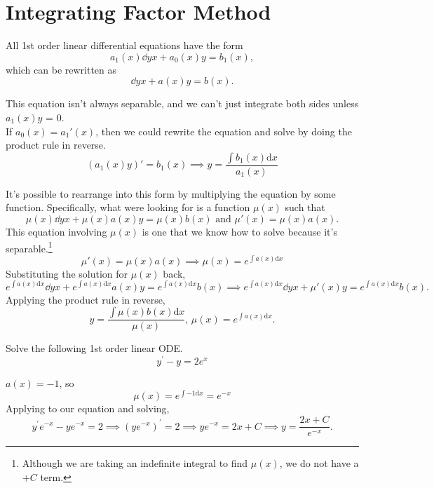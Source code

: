 \section{Integrating Factor Method}
All 1st order linear differential equations have the form
\begin{equation*}
	a_1(x)\dd{y}{x} + a_0(x)y = b_1(x),
\end{equation*}
which can be rewritten as
\begin{equation*}
	\dd{y}{x} + a(x)y = b(x).
\end{equation*}

\noindent
This equation isn't always separable, and we can't just integrate both sides unless $a_1(x)y$ = 0.\\

\noindent
If $a_0(x) = a_1'(x)$, then we could rewrite the equation and solve by doing the product rule in reverse.
\begin{equation*}
	\left(a_1(x)y\right)' = b_1(x) \implies y = \frac{\int{b_1(x) \mathrm{d}x}}{a_1(x)}
\end{equation*}

\noindent
It's possible to rearrange into this form by multiplying the equation by some function. Specifically, what were looking for is a function $\mu(x)$ such that
\begin{equation*}
	\mu(x)\dd{y}{x} + \mu(x)a(x)y = \mu(x)b(x) \text{ and } \mu'(x) = \mu(x)a(x).
\end{equation*}
This equation involving $\mu(x)$ is one that we know how to solve because it's separable.\footnote{Although we are taking an indefinite integral to find $\mu(x)$, we do not have a $+ C$ term.}
\begin{equation*}
	\mu'(x) = \mu(x)a(x) \implies \mu(x) = e^{\int{a(x) \mathrm{d}x}}
\end{equation*}
Substituting the solution for $\mu(x)$ back,
\begin{equation*}
	e^{\int{a(x) \mathrm{d}x}}\dd{y}{x} + e^{\int{a(x) \mathrm{d}x}}a(x)y = e^{\int{a(x) \mathrm{d}x}}b(x) \implies e^{\int{a(x) \mathrm{d}x}}\dd{y}{x} + \mu'(x)y = e^{\int{a(x) \mathrm{d}x}}b(x).
\end{equation*}
Applying the product rule in reverse,
\begin{equation*}
	y = \frac{\int{\mu(x)} b(x) \mathrm{d}x}{\mu(x)} \text{, } \mu(x) = e^{\int{a(x) \mathrm{d}x}}.
\end{equation*}

\begin{example}
	Solve the following 1st order linear ODE.
	\begin{equation*}
		y^\prime - y = 2e^{x}
	\end{equation*}
\end{example}
\noindent
$a(x) = -1$, so
\begin{equation*}
	\mu(x) = e^{\int{-1 \mathrm{d}x}} = e^{-x}
\end{equation*}
Applying to our equation and solving,
\begin{equation*}
	y^\prime e^{-x} - ye^{-x} = 2 \implies \left(ye^{-x}\right)^\prime = 2 \implies ye^{-x} = 2x + C \implies y = \frac{2x + C}{e^{-x}}.
\end{equation*}